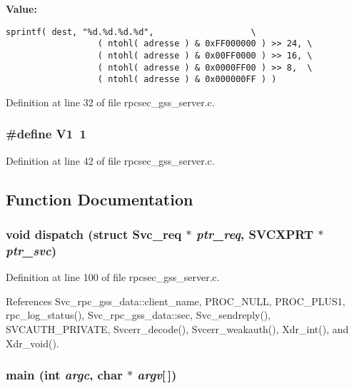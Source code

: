 {\bf Value:}

\footnotesize\begin{verbatim}sprintf( dest, "%d.%d.%d.%d",                   \
                  ( ntohl( adresse ) & 0xFF000000 ) >> 24, \
                  ( ntohl( adresse ) & 0x00FF0000 ) >> 16, \
                  ( ntohl( adresse ) & 0x0000FF00 ) >> 8,  \
                  ( ntohl( adresse ) & 0x000000FF ) )
\end{verbatim}\normalsize 


Definition at line 32 of file rpcsec\_\-gss\_\-server.c.
\subsubsection{\setlength{\rightskip}{0pt plus 5cm}\#define V1\ 1}\label{rpcsec__gss__server_8c_a6}




Definition at line 42 of file rpcsec\_\-gss\_\-server.c.

\subsection{Function Documentation}
\subsubsection{\setlength{\rightskip}{0pt plus 5cm}void dispatch (struct Svc\_\-req $\ast$ {\em ptr\_\-req}, SVCXPRT $\ast$ {\em ptr\_\-svc})}\label{rpcsec__gss__server_8c_a17}




Definition at line 100 of file rpcsec\_\-gss\_\-server.c.

References Svc\_\-rpc\_\-gss\_\-data::client\_\-name, PROC\_\-NULL, PROC\_\-PLUS1, rpc\_\-log\_\-status(), Svc\_\-rpc\_\-gss\_\-data::sec, Svc\_\-sendreply(), SVCAUTH\_\-PRIVATE, Svcerr\_\-decode(), Svcerr\_\-weakauth(), Xdr\_\-int(), and Xdr\_\-void().
\subsubsection{\setlength{\rightskip}{0pt plus 5cm}main (int {\em argc}, char $\ast$ {\em argv}[$\,$])}\label{rpcsec__gss__server_8c_a18}





